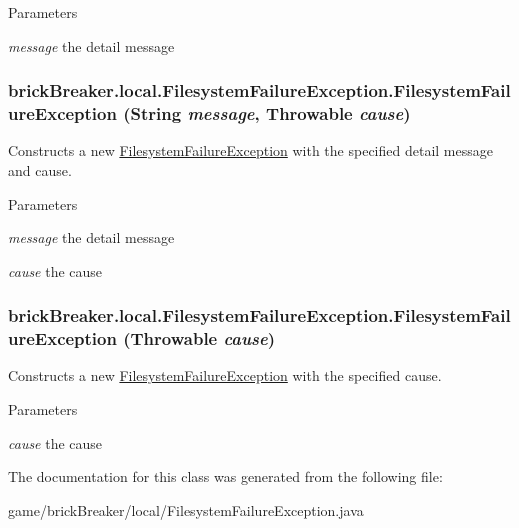 \begin{DoxyParams}{Parameters}
\item[{\em message}]the detail message \end{DoxyParams}
\hypertarget{classbrick_breaker_1_1local_1_1_filesystem_failure_exception_adac73a32ed79f64fddf90293d68506ad}{
\subsubsection[{FilesystemFailureException}]{\setlength{\rightskip}{0pt plus 5cm}brickBreaker.local.FilesystemFailureException.FilesystemFailureException (String {\em message}, \/  Throwable {\em cause})}}
\label{classbrick_breaker_1_1local_1_1_filesystem_failure_exception_adac73a32ed79f64fddf90293d68506ad}
Constructs a new {\ttfamily \hyperlink{classbrick_breaker_1_1local_1_1_filesystem_failure_exception}{FilesystemFailureException}} with the specified detail message and cause.


\begin{DoxyParams}{Parameters}
\item[{\em message}]the detail message \item[{\em cause}]the cause \end{DoxyParams}
\hypertarget{classbrick_breaker_1_1local_1_1_filesystem_failure_exception_aa72dd755aa1b25516a2fda4c08eb0551}{
\subsubsection[{FilesystemFailureException}]{\setlength{\rightskip}{0pt plus 5cm}brickBreaker.local.FilesystemFailureException.FilesystemFailureException (Throwable {\em cause})}}
\label{classbrick_breaker_1_1local_1_1_filesystem_failure_exception_aa72dd755aa1b25516a2fda4c08eb0551}
Constructs a new {\ttfamily \hyperlink{classbrick_breaker_1_1local_1_1_filesystem_failure_exception}{FilesystemFailureException}} with the specified cause.


\begin{DoxyParams}{Parameters}
\item[{\em cause}]the cause \end{DoxyParams}


The documentation for this class was generated from the following file:\begin{DoxyCompactItemize}
\item 
game/brickBreaker/local/FilesystemFailureException.java\end{DoxyCompactItemize}
